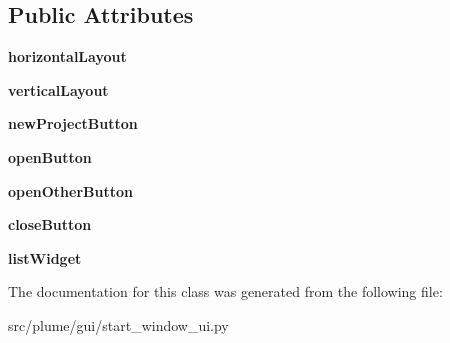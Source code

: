 \subsection*{Public Attributes}
\begin{DoxyCompactItemize}
\item 
{\bfseries horizontal\+Layout}\hypertarget{classplume-creator_1_1src_1_1plume_1_1gui_1_1start__window__ui_1_1_ui___start_window_a27e3dc0d6f1890310dc48015fd00c066}{}\label{classplume-creator_1_1src_1_1plume_1_1gui_1_1start__window__ui_1_1_ui___start_window_a27e3dc0d6f1890310dc48015fd00c066}

\item 
{\bfseries vertical\+Layout}\hypertarget{classplume-creator_1_1src_1_1plume_1_1gui_1_1start__window__ui_1_1_ui___start_window_aea70db9ce784b823abcada8ed89580c9}{}\label{classplume-creator_1_1src_1_1plume_1_1gui_1_1start__window__ui_1_1_ui___start_window_aea70db9ce784b823abcada8ed89580c9}

\item 
{\bfseries new\+Project\+Button}\hypertarget{classplume-creator_1_1src_1_1plume_1_1gui_1_1start__window__ui_1_1_ui___start_window_a74080cb1924d41de8fc3b500f9fbdba6}{}\label{classplume-creator_1_1src_1_1plume_1_1gui_1_1start__window__ui_1_1_ui___start_window_a74080cb1924d41de8fc3b500f9fbdba6}

\item 
{\bfseries open\+Button}\hypertarget{classplume-creator_1_1src_1_1plume_1_1gui_1_1start__window__ui_1_1_ui___start_window_a14b47d61a7b973bbb56296659ec666d7}{}\label{classplume-creator_1_1src_1_1plume_1_1gui_1_1start__window__ui_1_1_ui___start_window_a14b47d61a7b973bbb56296659ec666d7}

\item 
{\bfseries open\+Other\+Button}\hypertarget{classplume-creator_1_1src_1_1plume_1_1gui_1_1start__window__ui_1_1_ui___start_window_af89e9f0b2512d221f9fa4c2adb98e846}{}\label{classplume-creator_1_1src_1_1plume_1_1gui_1_1start__window__ui_1_1_ui___start_window_af89e9f0b2512d221f9fa4c2adb98e846}

\item 
{\bfseries close\+Button}\hypertarget{classplume-creator_1_1src_1_1plume_1_1gui_1_1start__window__ui_1_1_ui___start_window_a909076a4398a84e597beb59dc418b91e}{}\label{classplume-creator_1_1src_1_1plume_1_1gui_1_1start__window__ui_1_1_ui___start_window_a909076a4398a84e597beb59dc418b91e}

\item 
{\bfseries list\+Widget}\hypertarget{classplume-creator_1_1src_1_1plume_1_1gui_1_1start__window__ui_1_1_ui___start_window_ac303eb9b2132501eb66cc99f1f3b1a60}{}\label{classplume-creator_1_1src_1_1plume_1_1gui_1_1start__window__ui_1_1_ui___start_window_ac303eb9b2132501eb66cc99f1f3b1a60}

\end{DoxyCompactItemize}


The documentation for this class was generated from the following file\+:\begin{DoxyCompactItemize}
\item 
src/plume/gui/start\+\_\+window\+\_\+ui.\+py\end{DoxyCompactItemize}
